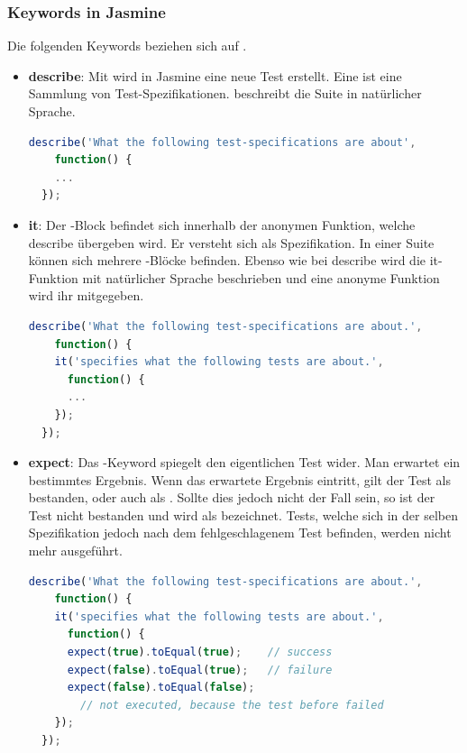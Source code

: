 \subsubsection{Keywords in Jasmine}
Die folgenden Keywords beziehen sich auf \cite[5-8]{Hahn:2013}.
\begin{itemize}
  \item \textbf{describe}:\newline
        Mit  wird in Jasmine eine neue Test  erstellt. Eine  ist eine Sammlung von Test-Spezifikationen.  beschreibt die Suite in natürlicher Sprache.
\begin{lstlisting}[language=JavaScript]
  describe('What the following test-specifications are about', 
    function() {
    ...
  });
\end{lstlisting}
  \item \textbf{it}:\newline
        Der -Block befindet sich innerhalb der anonymen Funktion, welche describe übergeben wird. Er versteht sich als Spezifikation. In einer Suite können sich mehrere -Blöcke befinden. Ebenso wie bei describe wird die it-Funktion mit natürlicher Sprache beschrieben und eine anonyme Funktion wird ihr mitgegeben.
\begin{lstlisting}[language=JavaScript]
  describe('What the following test-specifications are about.', 
    function() {
    it('specifies what the following tests are about.', 
      function() {
      ...
    });
  });
\end{lstlisting}
  \item \textbf{expect}:\newline
        Das -Keyword spiegelt den eigentlichen Test wider. Man erwartet ein bestimmtes Ergebnis. Wenn das erwartete Ergebnis eintritt, gilt der Test als bestanden, oder auch als . Sollte dies jedoch nicht der Fall sein, so ist der Test nicht bestanden und wird als  bezeichnet. Tests, welche sich in der selben Spezifikation jedoch nach dem fehlgeschlagenem Test befinden, werden nicht mehr ausgeführt.
\begin{lstlisting}[language=JavaScript]
  describe('What the following test-specifications are about.', 
    function() {
    it('specifies what the following tests are about.', 
      function() {
      expect(true).toEqual(true);    // success
      expect(false).toEqual(true);   // failure
      expect(false).toEqual(false);  
        // not executed, because the test before failed
    });
  });
\end{lstlisting}
\end{itemize}


